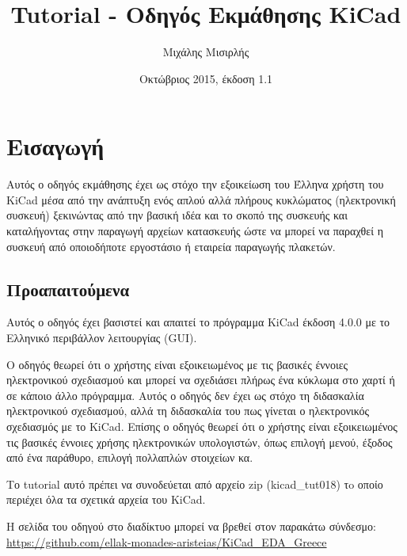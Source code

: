 \documentclass[a4paper]{article}
\title{Tutorial - Οδηγός Εκμάθησης KiCad}
\author{Μιχάλης Μισιρλής}
\date{Οκτώβριος 2015, έκδοση 1.1}
\begin{document}
\maketitle

\pagebreak
\tableofcontents
\pagebreak

\newpage
\section{Εισαγωγή}
Αυτός ο οδηγός εκμάθησης έχει ως στόχο την εξοικείωση του Έλληνα χρήστη του \textenglish{KiCad} μέσα από την ανάπτυξη ενός απλού αλλά πλήρους κυκλώματος (ηλεκτρονική συσκευή) ξεκινώντας από την βασική ιδέα και το σκοπό της συσκευής και καταλήγοντας στην παραγωγή αρχείων κατασκευής ώστε να μπορεί να παραχθεί η συσκευή από οποιοδήποτε εργοστάσιο ή εταιρεία παραγωγής πλακετών.

\subsection{Προαπαιτούμενα}
\label{sec:prereq}
Αυτός ο οδηγός έχει βασιστεί και απαιτεί το πρόγραμμα \textenglish{KiCad} έκδοση 4.0.0 με το Ελληνικό περιβάλλον λειτουργίας (GUI).

Ο οδηγός θεωρεί ότι ο χρήστης είναι εξοικειωμένος με τις βασικές έννοιες ηλεκτρονικού σχεδιασμού και μπορεί να σχεδιάσει πλήρως ένα κύκλωμα στο χαρτί ή σε κάποιο άλλο πρόγραμμα. Αυτός ο οδηγός δεν έχει ως στόχο τη διδασκαλία ηλεκτρονικού σχεδιασμού, αλλά τη διδασκαλία του πως γίνεται ο ηλεκτρονικός σχεδιασμός με το \textenglish{KiCad}. Επίσης ο οδηγός θεωρεί ότι ο χρήστης είναι εξοικειωμένος τις βασικές έννοιες χρήσης ηλεκτρονικών υπολογιστών, όπως επιλογή μενού, έξοδος από ένα παράθυρο, επιλογή πολλαπλών στοιχείων κα.


Το tutorial αυτό πρέπει να συνοδεύεται από αρχείο zip (kicad\_tut018) τo οποίο περιέχει όλα τα σχετικά αρχεία του \textenglish{KiCad}. 

Η σελίδα του οδηγού στο διαδίκτυο μπορεί να βρεθεί στον παρακάτω σύνδεσμο:\\
\href{https://github.com/ellak-monades-aristeias/KiCad\_EDA\_Greece}{https://github.com/ellak-monades-aristeias/KiCad\_EDA\_Greece}
\end{document}

